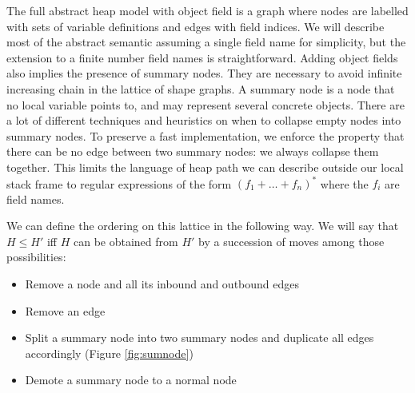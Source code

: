 \documentclass[11pt]{article}
\begin{document}
The full abstract heap model with object field is a graph where nodes are labelled with sets of variable definitions and edges with field indices.
We will describe most of the abstract semantic assuming a single field name for simplicity, but the extension to a finite number field names is straightforward.
Adding object fields also implies the presence of summary nodes. They are necessary to avoid infinite increasing chain in the lattice of shape graphs.
A summary node is a node that no local variable points to, and may represent several concrete objects.
There are a lot of different techniques and heuristics on when to collapse empty nodes into summary nodes.
To preserve a fast implementation, we enforce the property that there can be no edge between two summary nodes: we always collapse them together.
This limits the language of heap path we can describe outside our local stack frame to regular expressions of the form $(f_1+\dots+f_n)^*$ where the $f_i$ are field names.

We can define the ordering on this lattice in the following way.
We will say that $H\leq H'$ iff $H$ can be obtained from $H'$ by a succession of moves among those possibilities:
\begin{itemize}
\item Remove a node and all its inbound and outbound edges
\item Remove an edge
\item Split a summary node into two summary nodes and duplicate all edges accordingly (Figure \ref{fig:sumnode})
\item Demote a summary node to a normal node
\end{itemize}
\end{document}
